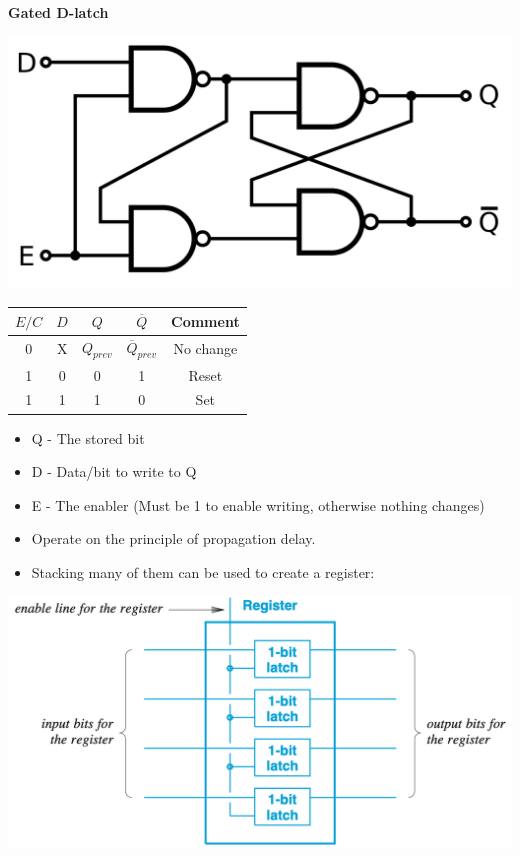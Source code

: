 \documentclass[letterpaper, 8pt]{extarticle}
\begin{document}
\begin{multicols*}{4}
	\textbf{Gated D-latch} \\
	\begin{center}
		\includegraphics[width=.6\linewidth]{gated-d-latch.png}
		\begin{tabular}[!ht]{@{}cc|ccc@{}}
			\toprule
			$E/C$ & $D$ & $Q$               & $\overline{Q}$               & Comment   \\
			\midrule
			0     & X   & $Q_\textit{prev}$ & $\overline{Q}_\textit{prev}$ & No change \\
			1     & 0   & 0                 & 1                            & Reset     \\
			1     & 1   & 1                 & 0                            & Set       \\
			\bottomrule
		\end{tabular}
	\end{center}
	\begin{itemize}
      \item Q - The stored bit
      \item D - Data/bit to write to Q
      \item E - The enabler (Must be 1 to enable writing, otherwise nothing changes)
      \item Operate on the principle of propagation delay.
      \item Stacking many of them can be used to create a register:
   \end{itemize}

	\includegraphics[width=\linewidth]{register.png}


\end{multicols*}
\end{document}
